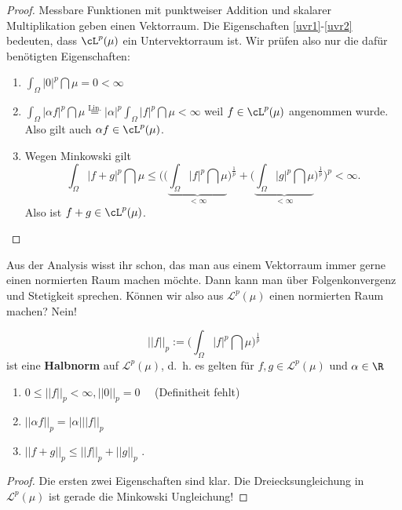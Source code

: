 \begin{proof}
	Messbare Funktionen mit punktweiser Addition und skalarer Multiplikation geben einen Vektorraum. Die Eigenschaften \ref{uvr1}-\ref{uvr2} bedeuten, dass $\cL^p(\mu)$ ein Untervektorraum ist. Wir prüfen also nur die dafür benötigten Eigenschaften:
	\begin{enumerate}[label=(\roman*)]
		\item $\int_{\Omega} |0|^p \dint \mu = 0<\infty$
		\item $\int_{\Omega} |\alpha f|^p \dint \mu \overset{\text{Lin.}}{=} |\alpha|^p \int_{\Omega} |f|^p \dint \mu < \infty$ weil $f \in \cL^p(\mu)$ angenommen wurde. Also gilt auch $\alpha f \in \cL^p(\mu)$.
		\item Wegen Minkowski gilt
		\[ \int_{\Omega} |f+g|^p \dint \mu \leq \Bigg( \Big( \underbrace{\int_{\Omega} |f|^p \dint \mu}_{< \infty} \Big)^{\frac{1}{p}} + \Big( \underbrace{\int_{\Omega} |g|^p \dint \mu}_{< \infty} \Big)^{\frac{1}{p}} \Bigg)^p < \infty. \]
		Also ist $f+g \in \cL^p(\mu)$.
	\end{enumerate}
\end{proof}
Aus der Analysis wisst ihr schon, das man aus einem Vektorraum immer gerne einen normierten Raum machen m\"ochte. Dann kann man \"uber Folgenkonvergenz und Stetigkeit sprechen. K\"onnen wir also aus $\mathcal L^p(\mu)$ einen normierten Raum machen? Nein!
\begin{lemma}
	\[ ||f||_p := \Big( \int_{\Omega} |f|^p \dint \mu \Big)^{\frac{1}{p}} \] ist eine \textbf{Halbnorm} auf $\mathcal L^p(\mu)$, \mbox{d. h.} es gelten f\"ur $f,g\in \mathcal L^p(\mu)$ und $\alpha\in \R$
	\begin{enumerate}[label=(\roman*)]
		\item $0 \leq ||f||_p < \infty, ||0||_p=0\quad$ (Definitheit fehlt)
		\item $ ||\alpha f ||_p = | \alpha | ||f||_p$
		\item $|| f + g ||_p \leq ||f||_p + ||g||_p$ .
	\end{enumerate}
\end{lemma}

\begin{proof}
	Die ersten zwei Eigenschaften sind klar. Die Dreiecksungleichung in $\mathcal L^p(\mu)$ ist gerade die Minkowski Ungleichung!
\end{proof}

